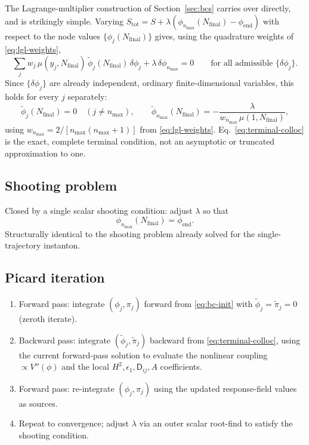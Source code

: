 \documentclass[a4paper,11pt]{article}
\newcommand{\Nfinal}{N_{\mathrm{final}}}     %
\newcommand{\epsSR}{\epsilon_1}              %
\newcommand{\Hub}{H}                         %
\newcommand{\field}{\phi}                    %
\newcommand{\mom}{\pi}                       %
\newcommand{\Vpot}{V}                        %
\newcommand{\phiend}{\field_{\mathrm{end}}}
\newcommand{\rfield}{\widetilde\field}       %
\newcommand{\rmom}{\widetilde\mom}           %
\newcommand{\yco}{y}                         %
\newcommand{\measure}{\mu}                   %
\newcommand{\advcoef}{A}                     %
\newcommand{\modeidx}{n}                     %
\newcommand{\Dcm}[1]{\mathsf{D}_{#1}}        %
\newcommand{\lag}{\lambda}                   %
\begin{document}
The Lagrange-multiplier construction of Section~\ref{sec:bcs} carries
over directly, and is strikingly simple.
Varying $S_{\mathrm{tot}}=S+\lag(\field_{\modeidx_{\max}}(\Nfinal)-\phiend)$
with respect to the node values $\{\field_j(\Nfinal)\}$ gives, using the
quadrature weights of \eqref{eq:lgl-weights},
\begin{equation}
    \sum_j w_j\,\measure(\yco_j,\Nfinal)\,\rfield_j(\Nfinal)\,\delta\field_j
    + \lag\,\delta\field_{\modeidx_{\max}}
    = 0
    \qquad \text{for all admissible } \{\delta\field_j\} .
\end{equation}
Since $\{\delta\field_j\}$ are already independent, ordinary
finite-dimensional variables,
this holds for every $j$ separately:
\begin{equation}
    \rfield_j(\Nfinal) = 0 \quad (j\neq\modeidx_{\max}) ,
    \qquad
    \rfield_{\modeidx_{\max}}(\Nfinal) = -\frac{\lag}{w_{\modeidx_{\max}}\,\measure(1,\Nfinal)} ,
    \label{eq:terminal-colloc}
\end{equation}
using $w_{\modeidx_{\max}}=2/[\modeidx_{\max}(\modeidx_{\max}+1)]$ from
\eqref{eq:lgl-weights}. Eq.~\eqref{eq:terminal-colloc} is
the exact, complete terminal condition, not an asymptotic or truncated
approximation to one.

\subsection{Shooting problem}
\label{sec:shooting}

Closed by a single scalar shooting condition: adjust $\lag$ so that
\begin{equation}
    \field_{\modeidx_{\max}}(\Nfinal) = \phiend .
\end{equation}
Structurally identical to the shooting problem already solved for the
single-trajectory instanton.

\subsection{Picard iteration}

\begin{enumerate}
    \item Forward pass: integrate $(\field_j,\mom_j)$ forward from
    \eqref{eq:bc-init} with $\rfield_j=\rmom_j=0$ (zeroth iterate).
    \item Backward pass: integrate $(\rfield_j,\rmom_j)$ backward from
    \eqref{eq:terminal-colloc}, using the current forward-pass solution to
    evaluate the nonlinear coupling $\propto\Vpot''(\field)$ and the
    local $\Hub^2,\epsSR,\Dcm{ij},\advcoef$ coefficients.
    \item Forward pass: re-integrate $(\field_j,\mom_j)$ using the
    updated response-field values as sources.
    \item Repeat to convergence; adjust $\lag$ via an outer scalar
    root-find to satisfy the shooting condition.
\end{enumerate}
\end{document}
